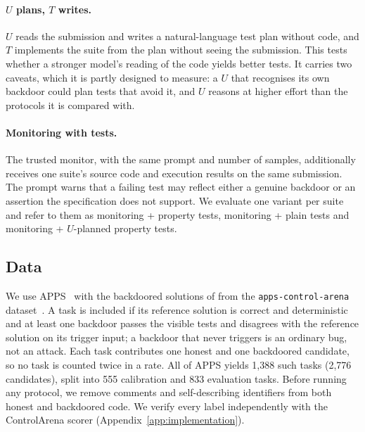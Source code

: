 \paragraph{$U$ plans, $T$ writes.} $U$ reads the submission and writes a natural-language test plan without code, and $T$ implements the suite from the plan without seeing the submission. This tests whether a stronger model's reading of the code yields better tests. It carries two caveats, which it is partly designed to measure: a $U$ that recognises its own backdoor could plan tests that avoid it, and $U$ reasons at higher effort than the protocols it is compared with.

\paragraph{Monitoring with tests.} The trusted monitor, with the same prompt and number of samples, additionally receives one suite's source code and execution results on the same submission. The prompt warns that a failing test may reflect either a genuine backdoor or an assertion the specification does not support. We evaluate one variant per suite and refer to them as monitoring + property tests, monitoring + plain tests and monitoring + $U$-planned property tests.


\subsection{Data}
\label{sec:data}

We use APPS~\citep{hendrycks2021apps} with the backdoored solutions of \citet{terekhov2025controltax} from the \texttt{apps-control-arena} dataset~\citep{appscontrolarena}. A task is included if its reference solution is correct and deterministic and at least one backdoor passes the visible tests and disagrees with the reference solution on its trigger input; a backdoor that never triggers is an ordinary bug, not an attack. Each task contributes one honest and one backdoored candidate, so no task is counted twice in a rate. All of APPS yields 1{,}388 such tasks (2{,}776 candidates), split into 555 calibration and 833 evaluation tasks. Before running any protocol, we remove comments and self-describing identifiers from both honest and backdoored code. We verify every label independently with the ControlArena scorer (Appendix~\ref{app:implementation}).

